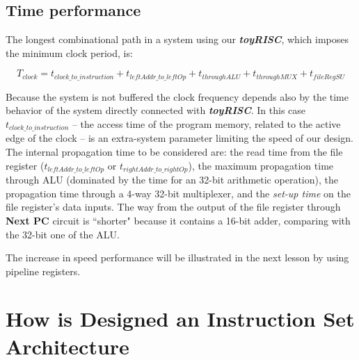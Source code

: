 \subsection{Time performance}

The longest combinational path in a system using our {\bf {\em
toyRISC}}, which imposes the minimum clock period, is:

$$T_{clock} = t_{clock\_to\_instruction} + t_{leftAddr\_to\_leftOp}
+ t_{throughALU} + t_{throughMUX} + t_{fileRegSU}$$

Because the system is not buffered the clock frequency depends also by the
time behavior of the system directly connected with {\bf {\em
toyRISC}}. In this case $t_{clock\_to\_instruction}$ -- the access
time of the program memory, related to the active edge of the
clock -- is an extra-system parameter limiting the speed of our
design. The internal propagation time to be considered are: the
read time from the file register ($t_{leftAddr\_to\_leftOp}$ or
$t_{rightAddr\_to\_rightOp}$), the maximum propagation time
through ALU (dominated by the time for an 32-bit arithmetic
operation), the propagation time through a 4-way 32-bit
multiplexer, and the {\em set-up time} on the file register's data
inputs. The way from the output of the file register through {\bf
Next PC} circuit is ``shorter" because it contains a 16-bit adder,
comparing with the 32-bit one of the ALU.

The increase in speed performance will be illustrated in the next lesson by using pipeline registers.

\section{How is Designed an Instruction Set Architecture}

